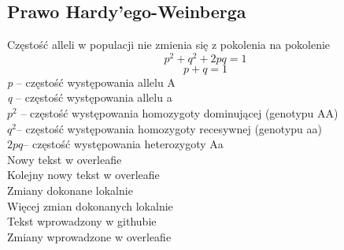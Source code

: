 \begin{flushleft}
\subsection{Prawo Hardy’ego-Weinberga }
 Częstość alleli w populacji nie zmienia się z pokolenia na pokolenie
\[p^2 + q^2 +2pq =1\]
\[p + q = 1\]
\textit{p} – częstość występowania allelu A\\
\textit{q} – częstość występowania allelu a\\
$p^2$ – częstość występowania homozygoty dominującej (genotypu AA)\\
$q^2$– częstość występowania homozygoty recesywnej (genotypu aa)\\
$2pq$– częstość występowania heterozygoty Aa\\

Nowy tekst w overleafie\\
Kolejny nowy tekst w overleafie\\
Zmiany dokonane lokalnie\\
Więcej zmian dokonanych lokalnie\\
Tekst wprowadzony w githubie\\
Zmiany wprowadzone w overleafie\\
\end{flushleft}
